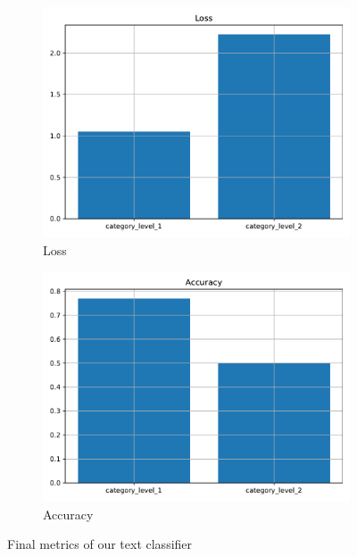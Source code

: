 \begin{figure}[htpb]
	\centering
	\begin{subfigure}{0.48\linewidth}
		\centering
		\includegraphics[width=\linewidth]{Images/final_loss_categories.pdf}
		\caption{Loss}
		\label{fig:classifier_final_loss}
	\end{subfigure}
	\begin{subfigure}{0.48\linewidth}
		\centering
		\includegraphics[width=\linewidth]{Images/final_accuracy_categories.pdf}
		\caption{Accuracy}
		\label{fig:classifier_final_accuracy}
	\end{subfigure}
	\caption{Final metrics of our text classifier}
	\label{fig:classifier_final_metrics}
\end{figure}


